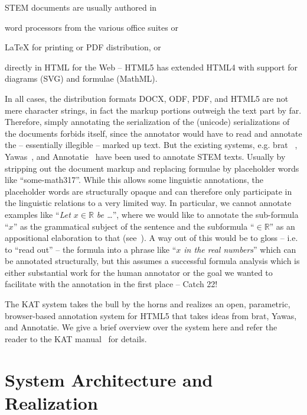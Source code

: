 \documentclass{llncs}
\def\nlex#1{``\emph{#1}''}
\def\KAT{\textsf{KAT}\xspace}
\begin{document}
STEM documents are usually authored in
\begin{inparaenum}[\em i\rm)]
\item word processors from the various office suites or
\item {\LaTeX} for printing or PDF distribution, or
\item directly in HTML for the Web -- HTML5 has extended HTML4 with support for diagrams
  (SVG) and formulae (MathML).
\end{inparaenum}
In all cases, the distribution formats DOCX, ODF, PDF, and HTML5 are not mere character
strings, in fact the markup portions outweigh the text part by far. Therefore, simply
annotating the serialization of the (unicode) serializations of the documents forbids
itself, since the annotator would have to read and annotate the -- essentially illegible
-- marked up text. But the existing systems, e.g. \textsf{brat} ~\cite {brat:on},
\textsf{Yawas}~\cite{yawas:on}, and \textsf{Annotatie}~\cite{annotatie:on} have been used
to annotate STEM texts. Usually by stripping out the document markup and replacing
formulae by placeholder words like ``some-math317''.  While this allows some linguistic
annotations, the placeholder words are structurally opaque and can therefore only
participate in the linguistic relations to a very limited way. In particular, we cannot
annotate examples like \nlex{Let $x\in\mathbb{R}$ be \ldots}, where we would like to
annotate the sub-formula \nlex{$x$} as the grammatical subject of the sentence and the
subformula \nlex{$\in\mathbb{R}$} as an appositional elaboration to that
(see~\cite{Wolska:PHD}). A way out of this would be to gloss -- i.e. to ``read out'' --
the formula into a phrase like \nlex{$x$ in the real numbers} which can be annotated
structurally, but this assumes a successful formula analysis which is either substantial
work for the human annotator or the goal we wanted to facilitate with the annotation in
the first place -- Catch 22!

The \KAT system takes the bull by the horns and realizes an open, parametric,
browser-based annotation system for HTML5 that takes ideas from \textsf{brat},
\textsf{Yawas}, and \textsf{Annotatie}. We give a brief overview over the system here and
refer the reader to the \KAT manual~\cite{DumGinKoh:katsdm14} for details.

\section{System Architecture and Realization}\label{sec:arch}
\end{document}

